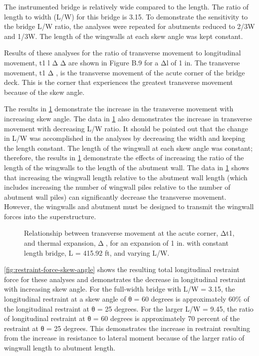 The instrumented bridge is relatively wide compared to the length. The ratio of length to width (L/W) for this
bridge is 3.15. To demonstrate the sensitivity to the bridge L/W ratio, the analyses were repeated for abutments
reduced to 2/3W and 1/3W. The length of the wingwalls at each skew angle was kept constant.

Results of these analyses for the ratio of transverse movement to longitudinal movement, t1 l
Δ
Δ are shown in
Figure B.9 for a Δl of 1 in. The transverse movement, t1 Δ , is the transverse movement of the acute corner of the
bridge deck. This is the corner that experiences the greatest transverse movement because of the skew angle.

The results in \cref{fig:transverse-movement-thermal-expansion} demonstrate the increase in the transverse movement with increasing skew angle. The
data in \cref{fig:transverse-movement-thermal-expansion} also demonstrates the increase in transverse movement with decreasing L/W ratio. It should be
pointed out that the change in L/W was accomplished in the analyses by decreasing the width and keeping the length
constant. The length of the wingwall at each skew angle was constant; therefore, the results in \cref{fig:transverse-movement-thermal-expansion}
demonstrate the effects of increasing the ratio of the length of the wingwalls to the length of the abutment wall. The
data in \cref{fig:transverse-movement-thermal-expansion} shows that increasing the wingwall length relative to the abutment wall length (which includes
increasing the number of wingwall piles relative to the number of abutment wall piles) can significantly decrease the
transverse movement. However, the wingwalls and abutment must be designed to transmit the wingwall forces into
the superstructure.

\begin{figure}
  \caption{Relationship between transverse movement at the acute corner, Δt1, and thermal expansion, Δ, for an expansion of 1 in. with constant length bridge, L = 415.92 ft, and varying L/W.}
  \label{fig:transverse-movement-thermal-expansion}
\end{figure}

\cref{fig:restraint-force-skew-angle} shows the resulting total longitudinal restraint force for these analyses and demonstrates the decrease in longitudinal restraint with increasing skew angle. For the full-width bridge with L/W = 3.15, the longitudinal restraint at a skew angle of θ = 60 degrees is approximately 60\% of the longitudinal restraint at θ = 25 degrees. For the larger L/W = 9.45, the ratio of longitudinal restraint at θ = 60 degrees is approximately 70 percent of the restraint at θ = 25 degrees. This demonstrates the increase in restraint resulting from the increase in resistance to lateral moment because of the larger ratio of wingwall length to abutment length.

